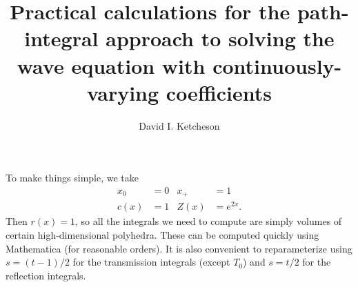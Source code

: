 \documentclass[11pt]{article}
\begin{document}
\title{Practical calculations for the path-integral approach to
  solving the wave equation with continuously-varying coefficients}
  
\author{David I. Ketcheson}

\maketitle

To make things simple, we take
\begin{align}
x_0 & = 0 & x_+ & = 1 \\
c(x) & = 1 & Z(x) & = e^{2x}.
\end{align}
Then $r(x)=1$, so all the integrals we need to compute are simply volumes
of certain high-dimensional polyhedra.  These can be computed quickly using 
Mathematica (for reasonable orders).  It is also convenient to reparameterize
using $s=(t-1)/2$ for the transmission integrals (except $T_0$) and $s=t/2$
for the reflection integrals.
\end{document}
